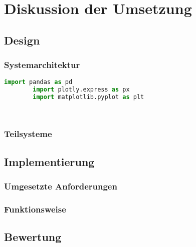 \chapter{Diskussion der Umsetzung}
\section{Design}
    \subsection{Systemarchitektur}

    \begin{lstlisting}[language=Python, caption=Python example]
        import pandas as pd
        import plotly.express as px
        import matplotlib.pyplot as plt

        
    \end{lstlisting}

    \subsection{Teilsysteme}

\section{Implementierung}
    \subsection{Umgesetzte Anforderungen}
    \subsection{Funktionsweise}

\section{Bewertung}